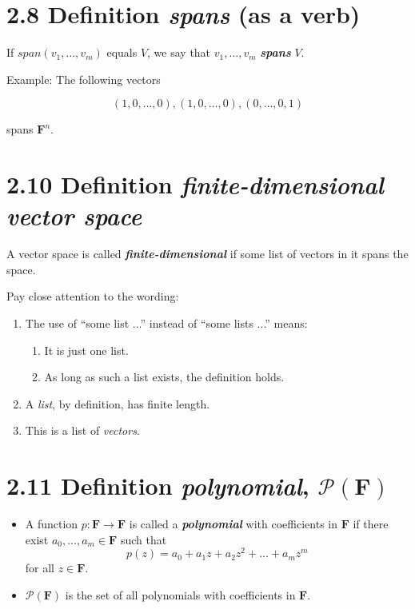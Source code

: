 \documentclass[12pt, letterpaper, oneside]{book}
\begin{document}
\section{2.8 Definition \textbf{\textit{spans}} (as a verb)}

If $span(v_1, \ldots, v_m)$ equals $V$, we say that $v_1, \ldots, v_m$ \textbf{
\textit{spans}} $V$.

Example: The following vectors

\[
  (1, 0, \ldots, 0), (1, 0, \ldots, 0), (0, \ldots, 0, 1)
\]

spans $\mathbf{F}^n$.

\section{2.10 Definition \textbf{\textit{finite-dimensional vector space}}}

A vector space is called \textbf{\textit{finite-dimensional}} if some list of
vectors in it spans the space.

Pay close attention to the wording:

\begin{enumerate}
  \item The use of ``some list ...'' instead of ``some lists ...'' means:
  \begin{enumerate}
    \item It is just one list.
    \item As long as such a list exists, the definition holds.
  \end{enumerate}
  \item A \textit{list}, by definition, has finite length.
  \item This is a list of \textit{vectors}.
\end{enumerate}

\section{2.11 Definition \textbf{\textit{polynomial}}, $\mathcal{P}(\mathbf{F})$}

\begin{itemize}
  \item A function $p: \mathbf{F} \rightarrow \mathbf{F}$ is called a \textbf{
    \textit{polynomial}} with coefficients in $\mathbf{F}$ if there exist $a_0,
    \ldots, a_m \in \mathbf{F}$ such that
    \[
      p(z) = a_0 + a_{1}z + a_{2}z^2 + \dots + a_{m}z^m
    \]
    for all $z \in \mathbf{F}$.
  \item $\mathcal{P}(\mathbf{F})$ is the set of all polynomials with
    coefficients in $\mathbf{F}$.
\end{itemize}
\end{document}
